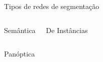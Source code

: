 \begin{frame}{Tipos de redes de segmentação}

    \begin{columns}

        \begin{center}
        {\Huge{} Semântica\par}
        \end{center}

        \begin{center}
        {\Huge{} De Instâncias\par}
        \end{center}
    \end{columns}
        \vspace{\fill}


      {\Huge\centering{} Panóptica\par}
\end{frame}
